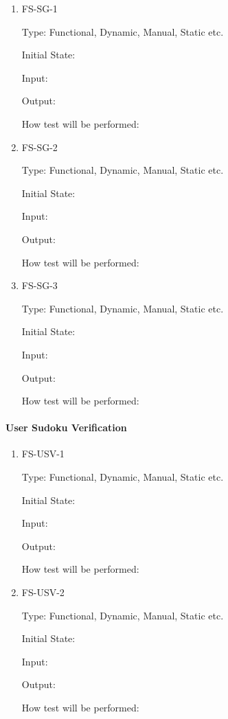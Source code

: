 \documentclass[11pt]{article}
\begin{document}
\begin{enumerate}

\item{FS-SG-1\\}

Type: Functional, Dynamic, Manual, Static etc.
					
Initial State: 
					
Input: 
					
Output: 
					
How test will be performed: 
					
\item{FS-SG-2\\}

Type: Functional, Dynamic, Manual, Static etc.
					
Initial State: 
					
Input: 
					
Output: 
					
How test will be performed: 

\item{FS-SG-3\\}

Type: Functional, Dynamic, Manual, Static etc.
					
Initial State: 
					
Input: 
					
Output: 
					
How test will be performed: 

\end{enumerate}

\paragraph{User Sudoku Verification}

\begin{enumerate}

\item{FS-USV-1\\}

Type: Functional, Dynamic, Manual, Static etc.
					
Initial State: 
					
Input: 
					
Output: 
					
How test will be performed: 
					
\item{FS-USV-2\\}

Type: Functional, Dynamic, Manual, Static etc.
					
Initial State: 
					
Input: 
					
Output: 
					
How test will be performed: 

\end{enumerate}
\end{document}
